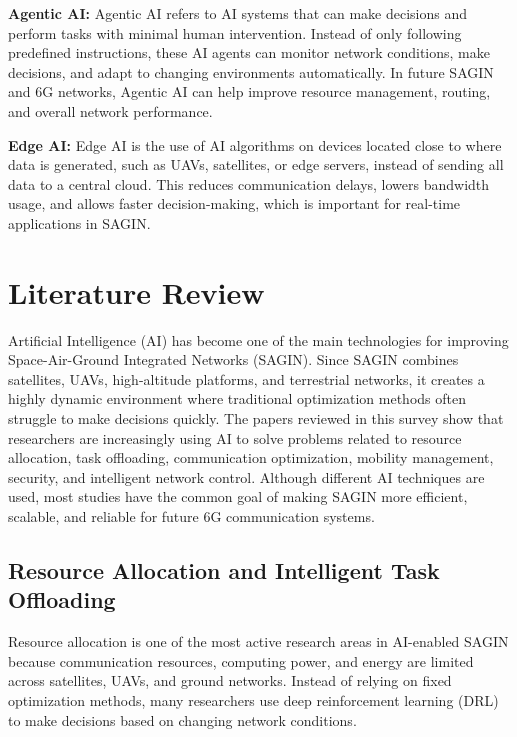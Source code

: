 \documentclass[letterpaper]{article} %
\begin{document}
\textbf{Agentic AI:} Agentic AI refers to AI systems that can make decisions and perform tasks with minimal human intervention. Instead of only following predefined instructions, these AI agents can monitor network conditions, make decisions, and adapt to changing environments automatically. In future SAGIN and 6G networks, Agentic AI can help improve resource management, routing, and overall network performance.

\textbf{Edge AI:} Edge AI is the use of AI algorithms on devices located close to where data is generated, such as UAVs, satellites, or edge servers, instead of sending all data to a central cloud. This reduces communication delays, lowers bandwidth usage, and allows faster decision-making, which is important for real-time applications in SAGIN.


\section{Literature Review}

Artificial Intelligence (AI) has become one of the main technologies for improving Space-Air-Ground Integrated Networks (SAGIN). Since SAGIN combines satellites, UAVs, high-altitude platforms, and terrestrial networks, it creates a highly dynamic environment where traditional optimization methods often struggle to make decisions quickly. The papers reviewed in this survey show that researchers are increasingly using AI to solve problems related to resource allocation, task offloading, communication optimization, mobility management, security, and intelligent network control. Although different AI techniques are used, most studies have the common goal of making SAGIN more efficient, scalable, and reliable for future 6G communication systems.

\subsection{Resource Allocation and Intelligent Task Offloading}

Resource allocation is one of the most active research areas in AI-enabled SAGIN because communication resources, computing power, and energy are limited across satellites, UAVs, and ground networks. Instead of relying on fixed optimization methods, many researchers use deep reinforcement learning (DRL) to make decisions based on changing network conditions.
\end{document}

